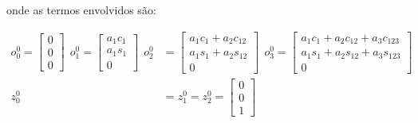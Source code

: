 onde as termos envolvidos são:

\begin{align*}
    o_0^0 = \begin{bmatrix}
                0 \\
                0 \\
                0
            \end{bmatrix} \ \ o_1^0 = \begin{bmatrix}
                                          a_1 c_1 \\
                                          a_1 s_1 \\
                                          0
                                      \end{bmatrix} \ \ o_2^0 & = \begin{bmatrix}
                                                                      a_1 c_1 + a_2 c_{12} \\
                                                                      a_1 s_1 + a_2 s_{12} \\
                                                                      0
                                                                  \end{bmatrix} \ \ o_3^0 = \begin{bmatrix}
                                                                                                a_1 c_1 + a_2 c_{12} + a_3 c_{123} \\
                                                                                                a_1 s_1 + a_2 s_{12} + a_3 s_{123} \\
                                                                                                0
                                                                                            \end{bmatrix} \\
    z_0^0                                     & = z_1^0 = z_2^0 = \begin{bmatrix}
                                                                      0 \\
                                                                      0 \\
                                                                      1
                                                                  \end{bmatrix}
\end{align*}

